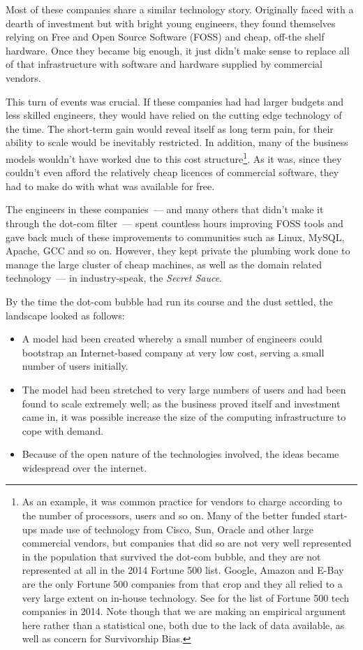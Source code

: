 \documentclass{book}
\begin{document}
Most of these companies share a similar technology story. Originally
faced with a dearth of investment but with bright young engineers,
they found themselves relying on Free and Open Source Software (FOSS)
and cheap, off-the shelf hardware. Once they became big enough, it
just didn't make sense to replace all of that infrastructure with
software and hardware supplied by commercial vendors.

This turn of events was crucial. If these companies had had larger
budgets and less skilled engineers, they would have relied on the
cutting edge technology of the time. The short-term gain would reveal
itself as long term pain, for their ability to scale would be
inevitably restricted. In addition, many of the business models
wouldn't have worked due to this cost structure\footnote{As an
  example, it was common practice for vendors to charge according to
  the number of processors, users and so on. Many of the better funded
  start-ups made use of technology from Cisco, Sun, Oracle and other
  large commercial vendors, but companies that did so are not very
  well represented in the population that survived the dot-com bubble,
  and they are not represented at all in the 2014 Fortune 500
  list. Google, Amazon and E-Bay are the only Fortune 500 companies
  from that crop and they all relied to a very large extent on
  in-house technology. See \cite{CRN01} for the list of Fortune 500
  tech companies in 2014. Note though that we are making an empirical
  argument here rather than a statistical one, both due to the lack of
  data available, as well as concern for Survivorship Bias.}. As it
was, since they couldn't even afford the relatively cheap licences of
commercial software, they had to make do with what was available for
free.

The engineers in these companies~--- and many others that didn't make
it through the dot-com filter~--- spent countless hours improving FOSS
tools and gave back much of these improvements to communities such as
Linux, MySQL, Apache, GCC and so on. However, they kept private the
plumbing work done to manage the large cluster of cheap machines, as
well as the domain related technology~--- in industry-speak, the
\emph{Secret Sauce}.

By the time the dot-com bubble had run its course and the dust
settled, the landscape looked as follows:

\begin{itemize}
\item A model had been created whereby a small number of engineers
  could bootstrap an Internet-based company at very low cost, serving
  a small number of users initially.
\item The model had been stretched to very large numbers of users and
  had been found to scale extremely well; as the business proved
  itself and investment came in, it was possible increase the size of
  the computing infrastructure to cope with demand.
\item Because of the open nature of the technologies involved, the
  ideas became widespread over the internet.
\end{itemize}
\end{document}
